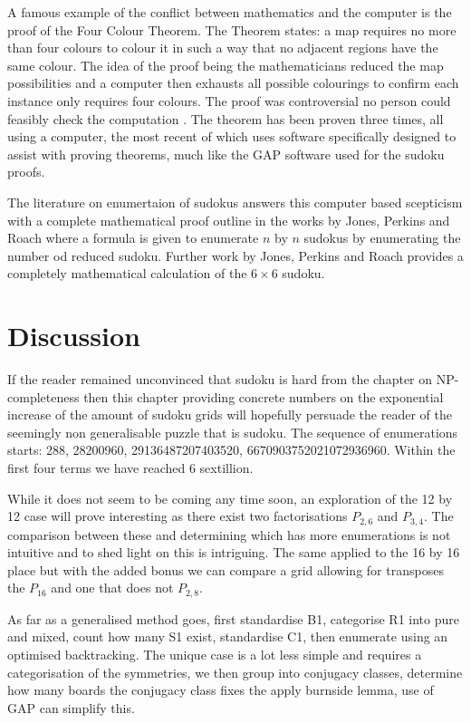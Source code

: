 \documentclass[a4paper,11pt]{report}
\newcounter{col}
\begin{document}
A famous example of the conflict between mathematics and the computer is the proof of the Four Colour Theorem. The Theorem states: a map requires no more than four colours to colour it in such a way that no adjacent regions have the same colour. The idea of the proof being the mathematicians reduced the map possibilities and a computer then exhausts all possible colourings to confirm each instance only requires four colours. The proof was controversial no person could feasibly check the computation \cite{swart1980philosophical}. The theorem has been proven three times\cite{appel1989every}\cite{BarNatan1996LieAA}\cite{gonthier2008formal}, all using a computer, the most recent of which uses software specifically designed to assist with proving theorems, much like the GAP software used for the sudoku proofs. 

The literature on enumertaion of sudokus answers this computer based scepticism with a complete mathematical proof outline in the works by Jones, Perkins and Roach \cite{mima2013number} where a formula is given to enumerate $n$ by $n$ sudokus by enumerating the number od reduced sudoku. Further work by Jones, Perkins and Roach \cite{jones2014number} provides a completely mathematical calculation of the $6\times6$ sudoku.

\section{Discussion}

If the reader remained unconvinced that sudoku is hard from the chapter on NP-completeness then this chapter providing concrete numbers on the exponential increase of the amount of sudoku grids will hopefully persuade the reader of the seemingly non generalisable puzzle that is sudoku. The sequence of enumerations starts: 288, 28200960, 29136487207403520\cite{https://oeis.org/A291187}, 6670903752021072936960. Within the first four terms we have reached 6 sextillion. 

While it does not seem to be coming any time soon, an exploration of the 12 by 12 case will prove interesting as there exist two factorisations $P_{2,6}$ and $P_{3,4}$. The comparison between these and determining which has more enumerations is not intuitive and to shed light on this is intriguing. The same applied to the 16 by 16 place but with the added bonus we can compare a grid allowing for transposes the $P_{16}$ and one that does not $P_{2,8}$.

As far as a generalised method goes, first standardise B1, categorise R1 into pure and mixed, count how many S1 exist, standardise C1, then enumerate using an optimised backtracking. The unique case is a lot less simple and requires a categorisation of the symmetries, we then group into conjugacy classes, determine how many boards the conjugacy class fixes the apply burnside lemma, use of GAP can simplify this.
\end{document}
